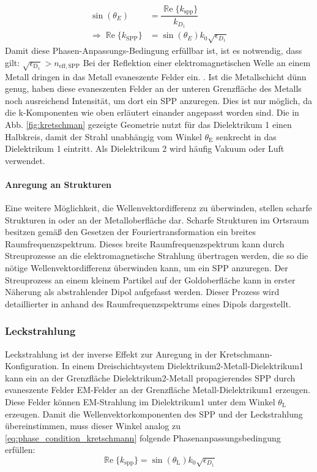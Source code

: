 \documentclass[titlepage]{article}
\renewcommand{\Re}{\operatorname{\mathbb{R}e}}
\begin{document}
	\begin{align}
		\label{eq:phase_condition_kretschmann}
		\sin(\theta_E) &= \dfrac{\Re\{k_{\mathrm{spp}}\}}{k_{D_1}}\\
		\Rightarrow \Re\{k_{\mathrm{SPP}}\} &= \sin(\theta_E) k_0 \sqrt{\epsilon_{D_1}}
	\end{align}
	Damit diese Phasen-Anpassungs-Bedingung erfüllbar ist, ist es notwendig, dass gilt: $\sqrt{\epsilon_\mathrm{D_1}} > n_\mathrm{eff, SPP}$
	Bei der Reflektion einer elektromagnetischen Welle an einem Metall dringen in das Metall evaneszente Felder ein. \cite{Novotny.2012b}. Ist die Metallschicht dünn genug, haben diese evaneszenten Felder an der unteren Grenzfläche des Metalls noch ausreichend Intensität, um dort ein SPP anzuregen. Dies ist nur möglich, da die k-Komponenten wie oben erläutert einander angepasst worden sind. Die in Abb. \ref{fig:kretschman} gezeigte Geometrie nutzt für das Dielektrikum 1 einen Halbkreis, damit der Strahl unabhängig vom Winkel $\theta_\mathrm{E}$ senkrecht in das Dielektrikum 1 eintritt. Als Dielektrikum 2 wird häufig Vakuum oder Luft verwendet.			
	
	\paragraph{Anregung an Strukturen}
	Eine weitere Möglichkeit, die Wellenvektordifferenz zu überwinden, stellen scharfe Strukturen in oder an der Metalloberfläche dar. Scharfe Strukturen im Ortsraum besitzen gemäß den Gesetzen der Fouriertransformation ein breites Raumfrequenzspektrum. Dieses breite Raumfrequenzspektrum kann durch Streuprozesse an die elektromagnetische Strahlung übertragen werden, die so die nötige Wellenvektordifferenz überwinden kann, um ein SPP anzuregen. Der Streuprozess an einem kleinem Partikel auf der Goldoberfläche kann in erster Näherung als abstrahlender Dipol aufgefasst werden. Dieser Prozess wird detaillierter in  anhand des Raumfrequenzspektrums eines Dipols dargestellt.
	\subsubsection{Leckstrahlung}
	\label{sec:leakage_radiation}
	Leckstrahlung ist der inverse Effekt zur Anregung in der Kretschmann-Konfiguration. In einem Dreischichtsystem Dielektrikum2-Metall-Dielektrikum1 kann ein an der Grenzfläche Dielektrikum2-Metall propagierendes SPP durch evaneszente Felder EM-Felder an der Grenzfläche Metall-Dielektrikum1 erzeugen. Diese Felder können EM-Strahlung im Dielektrikum1 unter dem Winkel $\theta_\mathrm{L}$ erzeugen. Damit die Wellenvektorkomponenten des SPP und der Leckstrahlung übereinstimmen, muss dieser Winkel analog zu \eqref{eq:phase_condition_kretschmann} folgende Phasenanpassungsbedingung erfüllen:
	\begin{equation}
		\label{eq:phase_condition}
		\boxed{\Re\{k_{\mathrm{spp}}\}=\sin(\theta_\mathrm{L}) k_0 \sqrt{\epsilon_{D_1}}}
	\end{equation}
	
\end{document}
